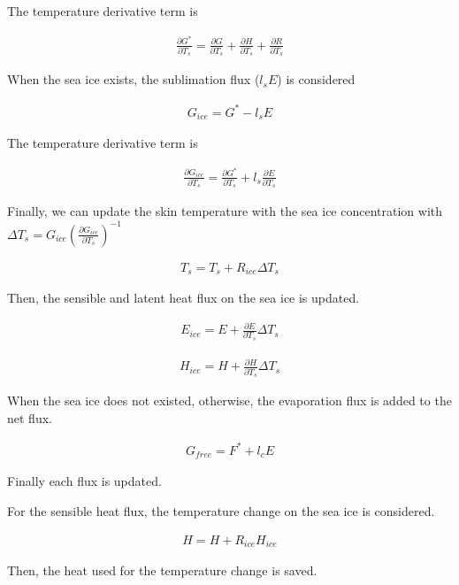 \begin{itemize}
The temperature derivative term is

\begin{eqnarray}
    \frac{\partial G^*}{\partial T_s} = \frac{\partial G}{\partial T_s}+\frac{\partial H}{\partial T_s}+\frac{\partial R}{\partial T_s}
\end{eqnarray}

When the sea ice exists, the sublimation flux (\(l_s E\)) is considered

\begin{eqnarray}
    G_{ice} = G^* - l_s E
\end{eqnarray}

The temperature derivative term is

\begin{eqnarray}
    \frac{\partial G_{ice}}{\partial T_s}=\frac{\partial G^*}{\partial T_s} + l_s\frac{\partial E}{\partial T_s}
\end{eqnarray}

Finally, we can update the skin temperature with the sea ice
concentration with
\(\Delta T_s=G_{ice} ( \frac{\partial G_{ice}}{\partial T_s})^{-1}\)

\begin{eqnarray}
    T_s = T_s +R_{ice} \Delta T_s
\end{eqnarray}

Then, the sensible and latent heat flux on the sea ice is updated.

\begin{eqnarray}
    E_{ice} = E + \frac{\partial E}{\partial T_s}\Delta T_s
\end{eqnarray}

\begin{eqnarray}
    H_{ice} = H + \frac{\partial H}{\partial T_s}\Delta T_s
\end{eqnarray}

When the sea ice does not existed, otherwise, the evaporation flux is
added to the net flux.

\begin{eqnarray}
    G_{free}=F^* + l_cE
\end{eqnarray}

Finally each flux is updated.

For the sensible heat flux, the temperature change on the sea ice is
considered.

\begin{eqnarray}
    H=H+ R_{ice}  H_{ice}
\end{eqnarray}

Then, the heat used for the temperature change is saved.


\end{itemize}
